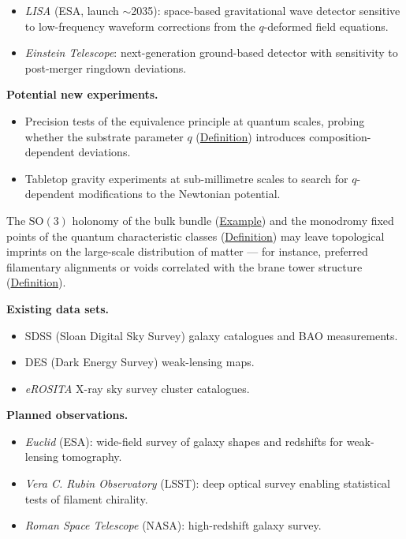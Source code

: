 \begin{itemize}
  \item \emph{LISA} (ESA, launch $\sim$2035): space-based gravitational wave detector sensitive to low-frequency waveform corrections from the $q$-deformed field equations.
  \item \emph{Einstein Telescope}: next-generation ground-based detector with sensitivity to post-merger ringdown deviations.
\end{itemize}

\textbf{Potential new experiments.}

\begin{itemize}
  \item Precision tests of the equivalence principle at quantum scales, probing whether the substrate parameter $q$ (\hyperref[def:substrate-parameter]{Definition}) introduces composition-dependent deviations.
  \item Tabletop gravity experiments at sub-millimetre scales to search for $q$-dependent modifications to the Newtonian potential.
\end{itemize}

\begin{remark}
  \label{rem:topological-defects}
The $\mathrm{SO}(3)$ holonomy of the bulk bundle
(\hyperref[def:c-quantum-universe]{Example}) and the monodromy fixed points of the
quantum characteristic classes (\hyperref[def:quantum-characteristic-classes]{Definition})
may leave topological imprints on the large-scale distribution of matter --- for
instance, preferred filamentary alignments or voids correlated with the brane
tower structure (\hyperref[def:recursive-brane-tower]{Definition}).
\end{remark}

\textbf{Existing data sets.}

\begin{itemize}
  \item SDSS (Sloan Digital Sky Survey) galaxy catalogues and BAO measurements.
  \item DES (Dark Energy Survey) weak-lensing maps.
  \item \emph{eROSITA} X-ray sky survey cluster catalogues.
\end{itemize}

\textbf{Planned observations.}

\begin{itemize}
  \item \emph{Euclid} (ESA): wide-field survey of galaxy shapes and redshifts for weak-lensing tomography.
  \item \emph{Vera C. Rubin Observatory} (LSST): deep optical survey enabling statistical tests of filament chirality.
  \item \emph{Roman Space Telescope} (NASA): high-redshift galaxy survey.
\end{itemize}

